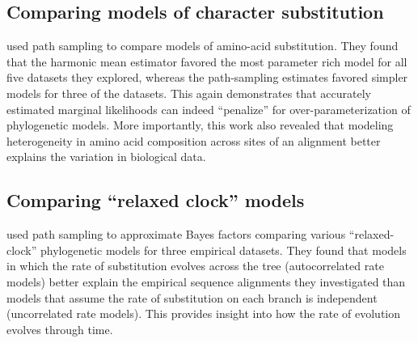 
\subsection{Comparing models of character substitution}

\citet{Lartillot2006} used path sampling to compare
models of amino-acid substitution.
They found that the harmonic mean estimator favored the most parameter rich
model for all five datasets they explored, whereas the path-sampling estimates
favored simpler models for three of the datasets.
This again demonstrates that accurately estimated marginal likelihoods can
indeed ``penalize'' for over-parameterization of phylogenetic models.
More importantly, this work also revealed that modeling heterogeneity in amino
acid composition across sites of an alignment better explains the variation in
biological data.

\subsection{Comparing ``relaxed clock'' models}

\citet{Lepage2007} used path sampling to approximate Bayes
factors comparing various ``relaxed-clock'' phylogenetic models for
three empirical datasets.
They found that models in which the rate of substitution evolves across the tree
(autocorrelated rate models) better explain the empirical sequence alignments
they investigated than models that assume the rate of substitution on each
branch is independent (uncorrelated rate models).
This provides insight into how the rate of evolution evolves through time.

